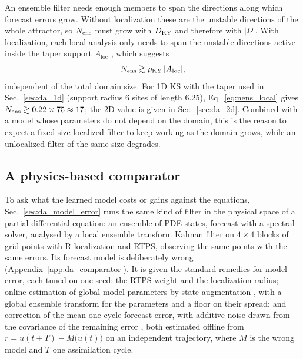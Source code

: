 An ensemble filter needs enough members to span the directions along
which forecast errors grow. Without localization these are the unstable
directions of the whole attractor, so $N_{\mathrm{ens}}$ must grow with $D_{\mathrm{KY}}$ and
therefore with $|\Omega|$. With localization, each local analysis only
needs to span the unstable directions active inside the taper support
$A_{\mathrm{loc}}$ \citep{patil2001,ott2004}, which suggests
\begin{equation}
  N_{\mathrm{ens}} \gtrsim \rho_{\mathrm{KY}}\,|A_{\mathrm{loc}}|,
  \label{eq:nens_local}
\end{equation}
independent of the total domain size. For 1D KS with the taper used in
Sec.~\ref{sec:da_1d} (support radius $6$ sites of length $6.25$),
Eq.~\eqref{eq:nens_local} gives $N_{\mathrm{ens}}\gtrsim 0.22\times75\approx17$; the 2D
value is given in Sec.~\ref{sec:da_2d}. Combined with a model whose
parameters do not depend on the domain, this is the reason to expect a
fixed-size localized filter to keep working as the domain grows, while an
unlocalized filter of the same size degrades.

\subsection{A physics-based comparator}
\label{sec:comparator}

To ask what the learned model costs or gains against the equations,
Sec.~\ref{sec:da_model_error} runs the same kind of filter in the physical
space of a partial differential equation: an ensemble of PDE states,
forecast with a spectral solver, analysed by a local ensemble transform
Kalman filter on $4\times4$ blocks of grid points with R-localization and
RTPS, observing the same points with the same errors. Its forecast model
is deliberately wrong (Appendix~\ref{app:da_comparator}). It is given the
standard remedies for model error, each tuned on one seed: the RTPS weight
and the localization radius; online estimation of global model parameters
by state augmentation \citep{anderson2001,ruiz2013}, with a global ensemble
transform for the parameters and a floor on their spread; and correction
of the mean one-cycle forecast error, with additive noise drawn from the
covariance of the remaining error \citep{dee2005}, both estimated offline
from $r = u(t+T)-M\big(u(t)\big)$ on an independent trajectory, where $M$
is the wrong model and $T$ one assimilation cycle.

